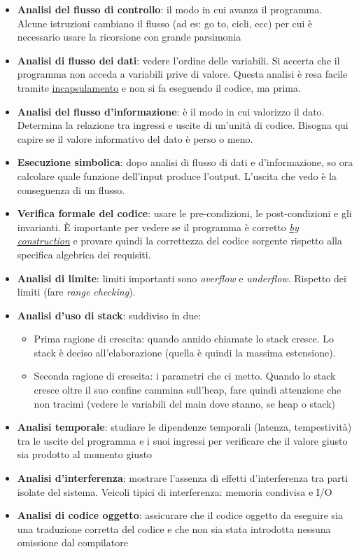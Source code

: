 		\begin{itemize}
			\item \textbf{Analisi del flusso di controllo}: il modo in cui avanza il programma. %
			Alcune istruzioni cambiano il flusso (ad es: go to, cicli, ecc) per cui è necessario usare la ricorsione con grande parsimonia
			\item\textbf{Analisi di flusso dei dati}: vedere l'ordine delle variabili. Si accerta che il programma non acceda a variabili prive di valore. Questa analisi è resa facile tramite \underline{\hyperref[incapsulamento]{incapsulamento}} e non si fa eseguendo il codice, ma prima.
			\item \textbf{Analisi del flusso d'informazione}: è il modo in cui valorizzo il dato. Determina la relazione tra ingressi e uscite di un'unità di codice. Bisogna qui capire se il valore informativo del dato è perso o meno.
			\item \textbf{Esecuzione simbolica}: dopo analisi di flusso di dati e d'informazione, so ora calcolare quale funzione dell'input produce l'output. L'uscita che vedo è la conseguenza di un flusso.
			\item \textbf{Verifica formale del codice}: usare le pre-condizioni, le post-condizioni e gli invarianti. È importante per vedere se il programma è corretto \textit{\underline{\hyperref[byconstruction]{by construction}}} e provare quindi la correttezza del codice sorgente rispetto alla specifica algebrica dei requisiti.
			\item \textbf{Analisi di limite}: limiti importanti sono \textit{overflow} e \textit{underflow}. Rispetto dei limiti (fare \textit{range checking}).
			\item \textbf{Analisi d'uso di stack}: suddiviso in due:
			\begin{itemize}
				\item Prima ragione di crescita: quando annido chiamate lo stack cresce. Lo stack è deciso all'elaborazione (quella è quindi la massima estensione).
				\item Seconda ragione di crescita: i parametri che ci metto. Quando lo stack cresce oltre il suo confine cammina sull'heap, fare quindi attenzione che non tracimi (vedere le variabili del main dove stanno, se heap o stack)
			\end{itemize}
			\item \textbf{Analisi temporale}: studiare le dipendenze temporali (latenza, tempestività) tra le uscite del programma e i suoi ingressi per verificare che il valore giusto sia prodotto al momento giusto
			\item \textbf{Analisi d'interferenza}: mostrare l’assenza di effetti d'interferenza tra parti isolate del sistema. Veicoli tipici di interferenza: memoria condivisa e I/O
			\item \textbf{Analisi di codice oggetto}: assicurare che il codice oggetto da eseguire sia una traduzione corretta del codice e che non sia stata introdotta nessuna omissione dal compilatore
		\end{itemize}


